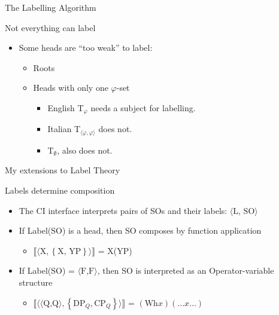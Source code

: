 \documentclass[Proposal]{subfiles}
\begin{document}
\begin{frame}
  {The Labelling Algorithm}

  \begin{block}
    {Not everything can label}
    \begin{itemize}[<+->]
      \item Some heads are ``too weak'' to label:
	\begin{itemize}
	  \item Roots
	  \item Heads with only one $\varphi$-set
	    \begin{itemize}
	      \item English T$_\varphi$ needs a subject for labelling.
	      \item Italian T$_{\langle \varphi,\varphi\rangle}$ does not.
        \item T$_\emptyset$, also does not.
	    \end{itemize}
	\end{itemize}
    \end{itemize}
  \end{block}
\end{frame}
\begin{frame}
  {My extensions to Label Theory}
  \begin{block}
    {Labels determine composition}
    \begin{itemize}
      \item The CI interface interprets pairs of SOs and their labels: $\langle \text{L, SO} \rangle$
      \item<2-> If Label(SO) is a head, then SO composes by function application
	\begin{itemize}
	  \item<3-> $\llbracket\langle \text{X}, \left\{ \text{X, YP} \right\}\rangle\rrbracket$ = X(YP)
	\end{itemize}
      \item<4-> If Label(SO) = $\langle\text{F,F}\rangle$, then SO is interpreted as an Operator-variable structure
	\begin{itemize}
	  \item<5-> $\llbracket\langle \langle\text{Q,Q} \rangle, \left\{ \text{DP}_Q, \text{CP}_Q \right\}\rangle\rrbracket$ = $(\text{Wh}x)(\dots x \dots)$
	\end{itemize}
    \end{itemize}
  \end{block}
\end{frame}
\end{document}
